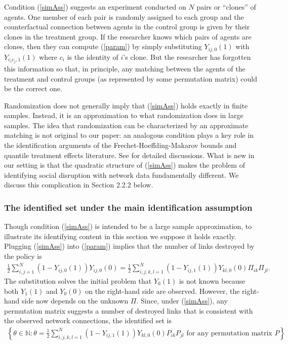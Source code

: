 \documentclass[12pt]{article}
\theoremstyle{definition}
\begin{document}
Condition (\ref{simAss}) suggests an experiment conducted on $N$ pairs or ``clones'' of agents. One member of each pair is randomly assigned to each group and the counterfactual connection between agents in the control group is given by their clones in the treatment group. If the researcher knows which pairs of agents are clones, then they can  compute (\ref{param}) by simply substituting $Y_{ij,0}(1)$ with $Y_{c_{i}c_{j},1}(1)$ where $c_{i}$ is the identity of $i$'s clone. But the researcher has forgotten this information so that, in principle, any matching between the agents of the treatment and control groups (as represented by some permutation matrix) could be the correct one.    

Randomization does not generally imply that (\ref{simAss}) holds exactly in finite samples. Instead, it is an approximation to what randomization does in large samples. The idea that randomization can be characterized by an approximate matching is not original to our paper: an analogous condition plays a key role in the identification arguments of the Frechet-Hoeffding-Makarov bounds and quantile treatment effects literature. See \cite{whitt1976bivariate,heckman1997making} for detailed discussions. What is new in our setting is that the quadratic structure of (\ref{simAss}) makes the problem of identifying social disruption with network data fundamentally different. We discuss this complication in Section 2.2.2 below.     

\subsubsection{The identified set under the main identification assumption}
Though condition (\ref{simAss}) is intended to be a large sample approximation, to illustrate its identifying content in this section we suppose it holds exactly. Plugging (\ref{simAss}) into (\ref{param}) implies that the number of links destroyed by the policy is   
\begin{align*}
\frac{1}{2}\sum_{i,j = 1}^{N}(1-Y_{ij,0}(1))Y_{ij,0}(0) = \frac{1}{2}\sum_{i,j,k,l = 1}^{N}(1-Y_{ij,1}(1))Y_{kl,0}(0)\Pi_{ik}\Pi_{jl}.
\end{align*}
The substitution solves the initial problem that $Y_{0}(1)$ is not known because both $Y_{1}(1)$ and $Y_{0}(0)$ on the right-hand side are observed. However, the right-hand side now depends on the unknown $\Pi$. Since, under (\ref{simAss}), any permutation matrix suggests a number of destroyed links that is consistent with the observed network connections, the identified set is   
 \begin{align}\label{paramset2}
 \left\{\theta \in \mathbb{N}: \theta = \frac{1}{2}\sum_{i,j,k,l = 1}^{N}(1-Y_{ij,1}(1))Y_{kl,0}(0)P_{ik}P_{jl} \text{ for any permutation matrix } P \right\}.
 \end{align}
\end{document}
